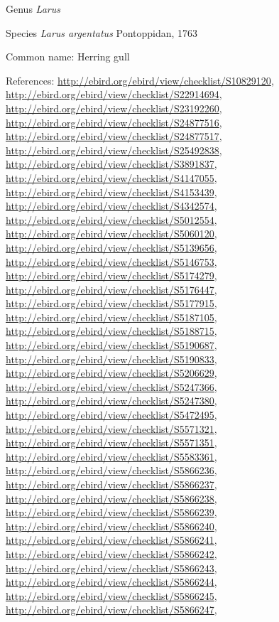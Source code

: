 \documentclass[9pt, article]{memoir}
\begin{document}
\begin{multicols}{2}
\vspace{6pt}\noindent\hspace{30pt}Genus \textit{Larus}


\vspace{6pt}\noindent\hspace{36pt}Species \textit{Larus argentatus} Pontoppidan, 1763


Common name: Herring gull

References: 
\url{http://ebird.org/ebird/view/checklist/S10829120}, 
\url{http://ebird.org/ebird/view/checklist/S22914694}, 
\url{http://ebird.org/ebird/view/checklist/S23192260}, 
\url{http://ebird.org/ebird/view/checklist/S24877516}, 
\url{http://ebird.org/ebird/view/checklist/S24877517}, 
\url{http://ebird.org/ebird/view/checklist/S25492838}, 
\url{http://ebird.org/ebird/view/checklist/S3891837}, 
\url{http://ebird.org/ebird/view/checklist/S4147055}, 
\url{http://ebird.org/ebird/view/checklist/S4153439}, 
\url{http://ebird.org/ebird/view/checklist/S4342574}, 
\url{http://ebird.org/ebird/view/checklist/S5012554}, 
\url{http://ebird.org/ebird/view/checklist/S5060120}, 
\url{http://ebird.org/ebird/view/checklist/S5139656}, 
\url{http://ebird.org/ebird/view/checklist/S5146753}, 
\url{http://ebird.org/ebird/view/checklist/S5174279}, 
\url{http://ebird.org/ebird/view/checklist/S5176447}, 
\url{http://ebird.org/ebird/view/checklist/S5177915}, 
\url{http://ebird.org/ebird/view/checklist/S5187105}, 
\url{http://ebird.org/ebird/view/checklist/S5188715}, 
\url{http://ebird.org/ebird/view/checklist/S5190687}, 
\url{http://ebird.org/ebird/view/checklist/S5190833}, 
\url{http://ebird.org/ebird/view/checklist/S5206629}, 
\url{http://ebird.org/ebird/view/checklist/S5247366}, 
\url{http://ebird.org/ebird/view/checklist/S5247380}, 
\url{http://ebird.org/ebird/view/checklist/S5472495}, 
\url{http://ebird.org/ebird/view/checklist/S5571321}, 
\url{http://ebird.org/ebird/view/checklist/S5571351}, 
\url{http://ebird.org/ebird/view/checklist/S5583361}, 
\url{http://ebird.org/ebird/view/checklist/S5866236}, 
\url{http://ebird.org/ebird/view/checklist/S5866237}, 
\url{http://ebird.org/ebird/view/checklist/S5866238}, 
\url{http://ebird.org/ebird/view/checklist/S5866239}, 
\url{http://ebird.org/ebird/view/checklist/S5866240}, 
\url{http://ebird.org/ebird/view/checklist/S5866241}, 
\url{http://ebird.org/ebird/view/checklist/S5866242}, 
\url{http://ebird.org/ebird/view/checklist/S5866243}, 
\url{http://ebird.org/ebird/view/checklist/S5866244}, 
\url{http://ebird.org/ebird/view/checklist/S5866245}, 
\url{http://ebird.org/ebird/view/checklist/S5866247}, 

\end{multicols}
\end{document}

